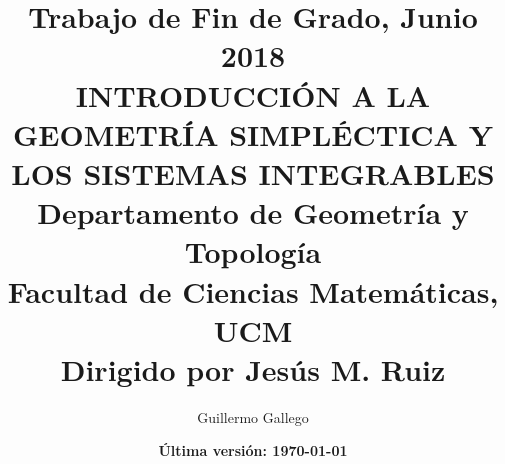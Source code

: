 \documentclass[12pt,a4paper]{amsart}
\begin{document}
\thispagestyle{plain}

\title[INTRODUCCIÓN A LA GEOMETRÍA SIMPLÉCTICA Y LOS SISTEMAS INTEGRABLES]{
{\rm\tiny Trabajo  \hspace{-1mm}de  \hspace{-1mm}Fin  \hspace{-1mm}de  \hspace{-1mm}Grado,  
\hspace{-1mm}Junio  \hspace{-1mm}2018}\\[8pt] 
INTRODUCCIÓN A LA GEOMETRÍA SIMPLÉCTICA Y LOS SISTEMAS INTEGRABLES\\[8pt]
{\rm\tiny Departamento \hspace{-1mm}de  \hspace{-1mm}Geometría  \hspace{-1mm}y  \hspace{-1mm}Topología\\
Facultad  \hspace{-1mm}de  \hspace{-1mm}Ciencias \hspace{-1mm}Matem\'aticas,  \hspace{-1mm}UCM\\
{\rm\tiny Dirigido por Jes\'us M. Ruiz}
}}

\author{Guillermo Gallego}
\date{\textbf{Última versión: \today }}




\maketitle
\setcounter{tocdepth}{1}
\newpage
\tableofcontents







\nocite{*}


\end{document}
